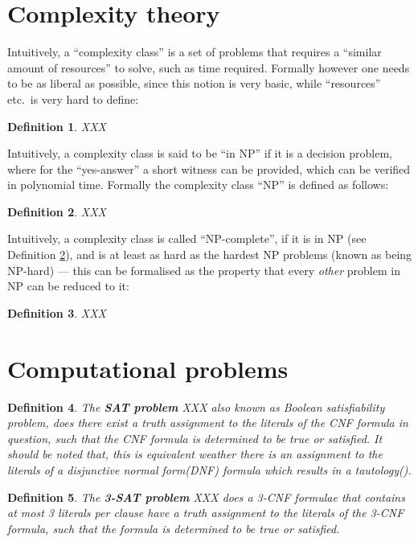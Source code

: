 \documentclass[a4paper]{report}
\newtheorem{defi}{Definition}[section]
\begin{document}
\section{Complexity theory}
\label{sec:basicscomplexitytheory}

Intuitively, a ``complexity class'' is a set of problems that requires a ``similar amount of resources'' to solve, such as time required. Formally however one needs to be as liberal as possible, since this notion is very basic, while ``resources'' etc.\ is very hard to define:
\begin{defi}\label{def:complexityclass}
  XXX
\end{defi}

Intuitively, a complexity class is said to be ``in NP'' if it is a decision problem, where for the ``yes-answer'' a short witness can be provided, which can be verified in polynomial time. Formally the complexity class ``NP'' is defined as follows:
\begin{defi}\label{def:inNP}
  XXX
\end{defi}

Intuitively, a complexity class is called ``NP-complete'', if it is in NP (see Definition \ref{def:inNP}), and is at least as hard as the hardest NP problems (known as being NP-hard) --- this can be formalised as the property that every \emph{other} problem in NP can be reduced to it:
\begin{defi}\label{def:NPcomplete}
  XXX
\end{defi}


\section{Computational problems}
\label{sec:computationalproblems}

\begin{defi}\label{def:SATproblem}
  The \textbf{SAT problem} XXX also known as Boolean satisfiability problem, does there exist a truth assignment to the literals of the CNF formula in question, such that the CNF formula is determined to be true or satisfied. It should be noted that, this is equivalent weather there is an assignment to the literals of a disjunctive normal form(DNF) formula which results in a tautology(\cite{Karp1972NP}).
\end{defi}

\begin{defi}\label{def:3SATproblem}
  The \textbf{3-SAT problem} XXX does a 3-CNF formulae that contains at most 3 literals per clause have a truth assignment to the literals of the 3-CNF formula, such that the formula is
determined to be true or satisfied. 
\end{defi}
\end{document}
